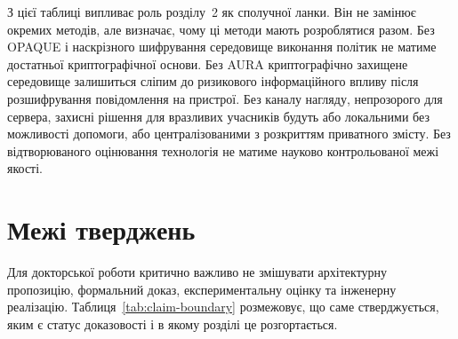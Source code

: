 З цієї таблиці випливає роль розділу~2 як сполучної ланки. Він не замінює окремих методів, але визначає, чому ці методи мають розроблятися разом. Без OPAQUE і наскрізного шифрування середовище виконання політик не матиме достатньої криптографічної основи. Без AURA криптографічно захищене середовище залишиться сліпим до ризикового інформаційного впливу після розшифрування повідомлення на пристрої. Без каналу нагляду, непрозорого для сервера, захисні рішення для вразливих учасників будуть або локальними без можливості допомоги, або централізованими з розкриттям приватного змісту. Без відтворюваного оцінювання технологія не матиме науково контрольованої межі якості.

\section{Межі тверджень}
\label{sec:claim-boundaries}

Для докторської роботи критично важливо не змішувати архітектурну пропозицію, формальний доказ, експериментальну оцінку та інженерну реалізацію. Таблиця~\ref{tab:claim-boundary} розмежовує, що саме стверджується, яким є статус доказовості і в якому розділі це розгортається.

